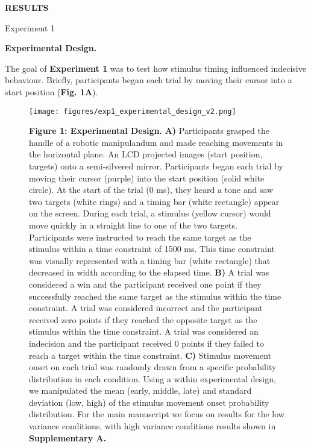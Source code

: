 \documentclass[12pt]{article}
\newcommand\boldblue[1]{\textcolor{mydarkblue}{\textbf{#1}}}
\newcommand{\SectionHeader}[1]{\noindent\boldblue{\Large{#1}}\normalsize }
\newcommand{\SubSectionHeader}[1]{\noindent\Large{\textcolor{mydarkblue}{#1}}\normalsize }
\begin{document}
\vspace{2mm}
\SectionHeader{RESULTS}
\vspace{-1mm}

\SubSectionHeader{Experiment 1}
\vspace{-1mm}

\noindent\boldblue{Experimental Design.}

\noindent The goal of \boldblue{Experiment 1} was to test how stimulus timing influenced indecisive behaviour. Briefly, participants began each trial by moving their cursor into a start position (\boldblue{Fig. 1A}). 

\begin{figure}[H]
  \centering
  \texttt{[image: figures/exp1\_experimental\_design\_v2.png]}
  \caption*{\boldblue{Figure 1: Experimental Design.} \boldblue{A)} Participants grasped the handle of a robotic manipulandum and made reaching movements in the horizontal plane. An LCD projected images (start position, targets) onto a semi-silvered mirror. Participants began each trial by moving their cursor (purple) into the start position (solid white circle). At the start of the trial (0 ms), they heard a tone and saw two targets (white rings) and a timing bar (white rectangle) appear on the screen. During each trial, a stimulus (yellow cursor) would move quickly in a straight line to one of the two targets. Participants were instructed to reach the same target as the stimulus within a time constraint of 1500 ms. This time constraint was visually represented with a timing bar (white rectangle) that decreased in width according to the elapsed time. \boldblue{B)} A trial was considered a win and the participant received one point if they successfully reached the same target as the stimulus within the time constraint. A trial was considered incorrect and the participant received zero points if they reached the opposite target as the stimulus within the time constraint. A trial was considered an indecision and the participant received 0 points if they failed to reach a target within the time constraint. \boldblue{C)} Stimulus movement onset on each trial was randomly drawn from a specific probability distribution in each condition. Using a within experimental design, we manipulated the mean (early, middle, late) and standard deviation (low, high) of the stimulus movement onset probability distribution. For the main manuscript we focus on results for the low variance conditions, with high variance conditions results shown in \boldblue{Supplementary A.}}
\end{figure}
\end{document}
